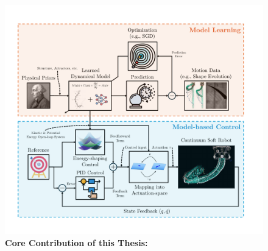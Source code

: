 \begin{figure}[ht]
    \centering
    \includegraphics[width=0.9\linewidth]{introduction/figures/model_based_control_with_learned_models_v2_cropped.pdf}
    \caption{\textbf{Core Contribution of this Thesis:} 
}
\end{figure}
